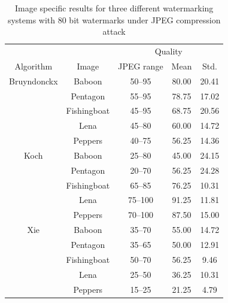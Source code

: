 \documentclass[12pt]{report}
\begin{document}
\begin{table}[htb]
\tiny
        \begin{center}
                \begin{tabular}{|c|c|c|c|c|} \hline
				&		& \multicolumn{3}{c|}{Quality}           \\ \cline{3-5}
                Algorithm       & Image         & JPEG range 		& Mean         & Std.    \\ \hline\hline
                Bruyndonckx     & Baboon        & 50--95                 & 80.00         & 20.41  \\ \cline{2-5}
                                & Pentagon      & 55--95                 & 78.75         & 17.02  \\ \cline{2-5}
                                & Fishingboat   & 45--95                 & 68.75         & 20.56  \\ \cline{2-5}
                                & Lena          & 45--80                 & 60.00         & 14.72  \\ \cline{2-5}
                                & Peppers       & 40--75                 & 56.25         & 14.36  \\ \hline\hline

                Koch            & Baboon        & 25--80                 & 45.00         & 24.15  \\ \cline{2-5}
                                & Pentagon      & 20--70                 & 56.25         & 24.28  \\ \cline{2-5}
                                & Fishingboat   & 65--85                 & 76.25         & 10.31  \\ \cline{2-5}
                                & Lena          & 75--100                & 91.25         & 11.81  \\ \cline{2-5}
                                & Peppers       & 70--100                & 87.50         & 15.00  \\ \hline\hline

                Xie             & Baboon        & 35--70                 & 55.00         & 14.72  \\ \cline{2-5}
                                & Pentagon      & 35--65                 & 50.00         & 12.91  \\ \cline{2-5}
                                & Fishingboat   & 50--70                 & 56.25         & 9.46  \\ \cline{2-5}
                                & Lena          & 25--50                 & 36.25         & 10.31  \\ \cline{2-5}
                                & Peppers       & 15--25                 & 21.25         & 4.79   \\ \hline
        \end{tabular}
	\caption{Image specific results for three different watermarking systems with 80 bit watermarks under JPEG compression
	attack}
        \label{tab:imgSpecificBKX}
        \end{center}
\end{table}
\normalsize
\end{document}
